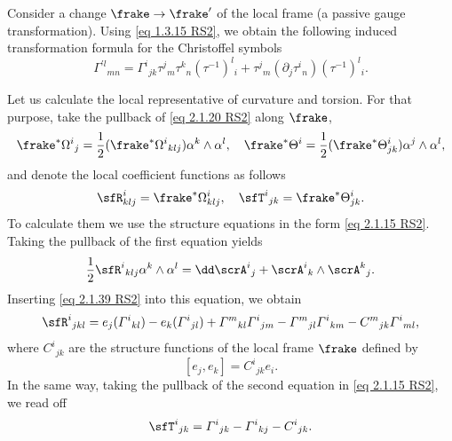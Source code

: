 \begin{rem}
    Consider a change $\frake\to \frake'$ of the local frame (a passive gauge transformation). Using \eqref{eq 1.3.15 RS2}, we obtain the following induced transformation formula for the Christoffel symbols 
    \[\varGamma^{\prime l}{}_{mn}=\varGamma^i{}_{jk}\tau^j{}_m \tau^k{}_n(\tau^{-1})^l{}_i+\tau^j{}_m(\partial_j \tau^i{}_n)(\tau^{-1})^l{}_i.\label{eq 2.1.40 RS2}\]
\end{rem}

Let us calculate the local representative of curvature and torsion. For that purpose, take the pullback of \eqref{eq 2.1.20 RS2} along $\frake$,
\[\frake^\ast \Omega^i{}_j=\frac12(\frake^\ast\Omega^i{}_{klj})\alpha^k\wedge\alpha^l,\quad \frake^\ast\Theta^i=\frac12(\frake^\ast\Theta^i_{jk})\alpha^j\wedge\alpha^l,\]
and denote the local coefficient functions as follows 
\[\sfR^i_{klj}=\frake^\ast\Omega^i_{klj},\quad \sfT^i{}_{jk}=\frake^\ast\Theta^i_{jk}.\]
To calculate them we use the structure equations in the form \eqref{eq 2.1.15 RS2}. Taking the pullback of the first equation yields 
\[\frac12\sfR^i{}_{klj}\alpha^k\wedge\alpha^l=\dd\scrA^i{}_j+\scrA^i{}_k\wedge \scrA^k{}_j.\]
Inserting \eqref{eq 2.1.39 RS2} into this equation, we obtain 
\[\sfR^i{}_{jkl}=e_j(\varGamma^i{}_{kl})-e_k(\varGamma^i{}_{jl})+\varGamma^m{}_{kl}\varGamma^i{}_{jm}-\varGamma^m{}_{jl}\varGamma^i{}_{km}-C^m{}_{jk}\varGamma^i{}_{ml},\label{eq 2.1.42 RS2}\]
where $C^i{}_{jk}$ are the structure functions of the local frame $\frake$ defined by 
\[[e_j,e_k]=C^i{}_{jk}e_i.\]
In the same way, taking the pullback of the second equation in \eqref{eq 2.1.15 RS2}, we read off 
\[\sfT^i{}_{jk}=\varGamma^i{}_{jk}-\varGamma^i{}_{kj}-C^i{}_{jk}.\label{eq 2.1.44 RS2}\]

